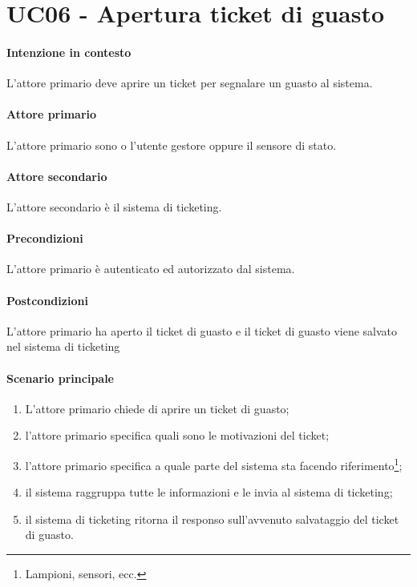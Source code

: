 \section{UC06 - Apertura ticket di guasto}\label{uc:06}

\paragraph{Intenzione in contesto} L'attore primario deve aprire un ticket per segnalare un guasto al sistema.

\paragraph{Attore primario} L'attore primario sono o l'utente gestore oppure il sensore di stato.

\paragraph{Attore secondario} L'attore secondario è il sistema di ticketing.

\paragraph{Precondizioni} L'attore primario è autenticato ed autorizzato dal sistema.

\paragraph{Postcondizioni} L'attore primario ha aperto il ticket di guasto e il ticket di guasto viene salvato nel sistema di ticketing

\paragraph{Scenario principale}

\begin{enumerate}
    \item L'attore primario chiede di aprire un ticket di guasto;
    \item l'attore primario specifica quali sono le motivazioni del ticket;
    \item l'attore primario specifica a quale parte del sistema sta facendo riferimento\footnote{Lampioni, sensori, ecc.};
    \item il sistema raggruppa tutte le informazioni e le invia al sistema di ticketing;
    \item il sistema di ticketing ritorna il responso sull'avvenuto salvataggio del ticket di guasto.
\end{enumerate}
